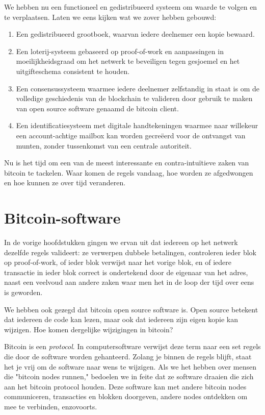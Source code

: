 \documentclass[
  letterpaper,
]{scrbook}
\begin{document}
We hebben nu een functioneel en gedistribueerd systeem om waarde te
volgen en te verplaatsen. Laten we eens kijken wat we zover hebben
gebouwd:

\begin{enumerate}
\def\labelenumi{\arabic{enumi}.}
\item
  Een gedistribueerd grootboek, waarvan iedere deelnemer een kopie
  bewaard.
\item
  Een loterij-systeem gebaseerd op proof-of-work en aanpassingen in
  moeilijkheidsgraad om het netwerk te beveiligen tegen gesjoemel en het
  uitgifteschema consistent te houden.
\item
  Een consensussysteem waarmee iedere deelnemer zelfstandig in staat is
  om de volledige geschiedenis van de blockchain te valideren door
  gebruik te maken van open source software genaamd de bitcoin client.
\item
  Een identificatiesysteem met digitale handtekeningen waarmee naar
  willekeur een account-achtige mailbox kan worden gecreëerd voor de
  ontvangst van munten, zonder tussenkomst van een centrale autoriteit.
\end{enumerate}

Nu is het tijd om een van de meest interessante en contra-intuïtieve
zaken van bitcoin te tackelen. Waar komen de regels vandaag, hoe worden
ze afgedwongen en hoe kunnen ze over tijd veranderen.

\hypertarget{bitcoin-software}{%
\section{Bitcoin-software}\label{bitcoin-software}}

In de vorige hoofdstukken gingen we ervan uit dat iedereen op het
netwerk dezelfde regels valideert: ze verwerpen dubbele betalingen,
controleren ieder blok op proof-of-work, of ieder blok verwijst naar het
vorige blok, en of iedere transactie in ieder blok correct is
ondertekend door de eigenaar van het adres, naast een veelvoud aan
andere zaken waar men het in de loop der tijd over eens is geworden.

We hebben ook gezegd dat bitcoin open source software is. Open source
betekent dat iedereen de code kan lezen, maar ook dat iedereen zijn
eigen kopie kan wijzigen. Hoe komen dergelijke wijzigingen in bitcoin?

Bitcoin is een \emph{protocol}. In computersoftware verwijst deze term
naar een set regels die door de software worden gehanteerd. Zolang je
binnen de regels blijft, staat het je vrij om de software naar wens te
wijzigen. Als we het hebben over mensen die "bitcoin nodes runnen,"
bedoelen we in feite dat ze software draaien die zich aan het bitcoin
protocol houden. Deze software kan met andere bitcoin nodes
communiceren, transacties en blokken doorgeven, andere nodes ontdekken
om mee te verbinden, enzovoorts.
\end{document}
